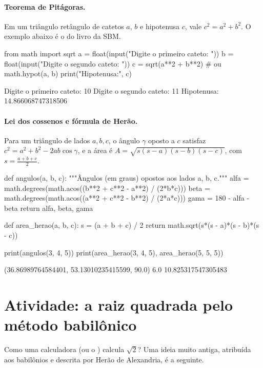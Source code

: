 \paragraph{Teorema de Pitágoras.} Em um triângulo retângulo de catetos $a$, $b$ e hipotenusa $c$, vale
$c^2=a^2+b^2$. O exemplo abaixo é o do livro da SBM.

\begin{entrada}
from math import sqrt
a = float(input("Digite o primeiro cateto: "))
b = float(input("Digite o segundo cateto: "))
c = sqrt(a**2 + b**2)          # ou math.hypot(a, b)
print("Hipotenusa:", c)
\end{entrada}
\begin{saida}
Digite o primeiro cateto: 10
Digite o segundo cateto: 11
Hipotenusa: 14.866068747318506
\end{saida}

\paragraph{Lei dos cossenos e fórmula de Herão.} Para um triângulo de lados $a,b,c$, o ângulo $\gamma$ oposto a
$c$ satisfaz $c^2=a^2+b^2-2ab\cos\gamma$, e a área é
$A=\sqrt{s(s-a)(s-b)(s-c)}$, com $s=\frac{a+b+c}{2}$.

\begin{entrada}
def angulos(a, b, c):
    """Ângulos (em graus) opostos aos lados a, b, c."""
    alfa = math.degrees(math.acos((b**2 + c**2 - a**2) / (2*b*c)))
    beta = math.degrees(math.acos((a**2 + c**2 - b**2) / (2*a*c)))
    gama = 180 - alfa - beta
    return alfa, beta, gama

def area_herao(a, b, c):
    s = (a + b + c) / 2
    return math.sqrt(s*(s - a)*(s - b)*(s - c))

print(angulos(3, 4, 5))
print(area_herao(3, 4, 5), area_herao(5, 5, 5))
\end{entrada}
\begin{saida}
(36.86989764584401, 53.13010235415599, 90.0)
6.0 10.825317547305483
\end{saida}

\section{Atividade: a raiz quadrada pelo método babilônico}

Como uma calculadora (ou o ) calcula $\sqrt{2}$? Uma ideia muito antiga, atribuída aos
babilônios e descrita por Herão de Alexandria, é a seguinte.

